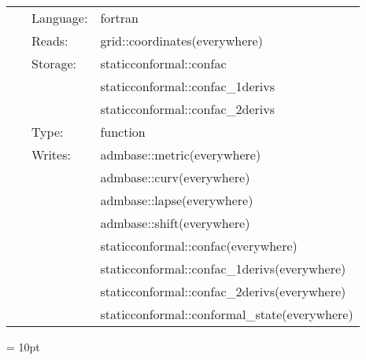  \begin{tabular*}{160mm}{cll} 
~ & Language:  & fortran \\ 
~ & Reads:  & grid::coordinates(everywhere) \\ 
~ & Storage:  & staticconformal::confac \\ 
~& ~ &staticconformal::confac\_1derivs\\ 
~& ~ &staticconformal::confac\_2derivs\\ 
~ & Type:  & function \\ 
~ & Writes:  & admbase::metric(everywhere) \\ 
~& ~ &admbase::curv(everywhere)\\ 
~& ~ &admbase::lapse(everywhere)\\ 
~& ~ &admbase::shift(everywhere)\\ 
~& ~ &staticconformal::confac(everywhere)\\ 
~& ~ &staticconformal::confac\_1derivs(everywhere)\\ 
~& ~ &staticconformal::confac\_2derivs(everywhere)\\ 
~& ~ &staticconformal::conformal\_state(everywhere)\\ 
\end{tabular*} 



\vspace{5mm}\parskip = 10pt 
